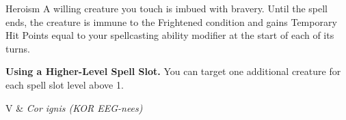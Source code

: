 \begin{Spell}[
    level=1st,
    time=1 Action,
    range=Touch,
    components={V, S},
    duration=Concentration 1 Minute,
    school=Enchantment,
    attack=None,
    effect=Frightened
]{Heroism}
A willing creature you touch is imbued with bravery. Until the spell ends, the creature is immune to the Frightened condition and gains Temporary Hit Points equal to your spellcasting ability modifier at the start of each of its turns.

\textbf{Using a Higher-Level Spell Slot.} You can target one additional creature for each spell slot level above 1.

\begin{components}
V & \textit{Cor ignis (KOR EEG-nees)}
\end{components}
\end{Spell}


